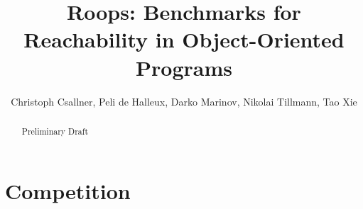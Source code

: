 \documentclass{article}
\title{Roops: Benchmarks for\\Reachability in Object-Oriented Programs}
\author{Christoph Csallner, Peli de Halleux, Darko Marinov, Nikolai Tillmann, Tao Xie}
\begin{document}
\maketitle

\tableofcontents

\begin{abstract}
Preliminary Draft
\end{abstract}





\appendix




\section{Competition}








\end{document}

